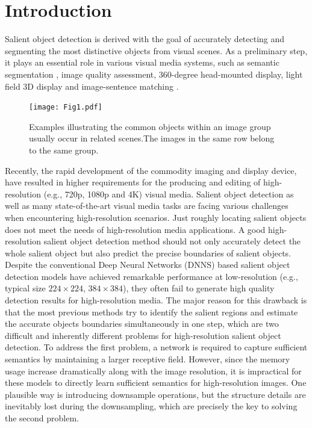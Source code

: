 \documentclass[sigconf]{acmart}
\begin{document}
%
\maketitle

\section{Introduction}

Salient object detection is derived with the goal of accurately detecting and segmenting the most distinctive objects from visual scenes. As a preliminary step, it plays an essential role in various visual media  systems, such as semantic segmentation \cite{DBLP:journals/pami/WeiLCSCFZY17}, 
image quality assessment\cite{DBLP:conf/mm/YangJLW19},
360-degree head-mounted display\cite{DBLP:conf/mm/NguyenYN18},
light field 3D display\cite{DBLP:conf/cvpr/WangLS0ZY18}
 and image-sentence matching \cite{Ji_2019_ICCV}.
 
 \begin{figure}[!t]
\centering
\texttt{[image: Fig1.pdf]}
\caption{Examples illustrating the common objects within an image group usually occur in related scenes.The images in the same row belong to the same group.}
\label{fig:label}
\end{figure}

 
Recently, the rapid development of the commodity imaging and display device, have resulted in higher requirements for the producing and editing of high-resolution (e.g., 720p, 1080p and 4K) visual media. Salient object detection as well as many state-of-the-art visual media tasks are facing various challenges when encountering high-resolution scenarios. Just roughly locating salient objects does not meet the needs of high-resolution media applications. 
A good high-resolution salient object detection method should not only accurately detect the whole salient object but also predict the precise boundaries of salient objects. Despite the conventional Deep Neural Networks (DNNS) based salient object detection models have achieved remarkable performance at low-resolution (e.g., typical size $224 \times 224$, $384 \times 384$), they  
often fail to generate high quality detection results for high-resolution media. The major reason for this drawback is that the most previous methods try to identify the salient regions and estimate the accurate objects boundaries simultaneously in one step, which are two difficult and inherently different problems for high-resolution salient object detection. To address the first problem, a network is required to capture sufficient semantics by maintaining a larger receptive field. 
However, since the memory usage increase dramatically along with the image resolution, it is impractical for these models to directly learn sufficient semantics for high-resolution images.
One plausible way is introducing downsample operations, but the structure details are inevitably lost during the downsampling, which are precisely the key to solving the second problem. 
\end{document}
